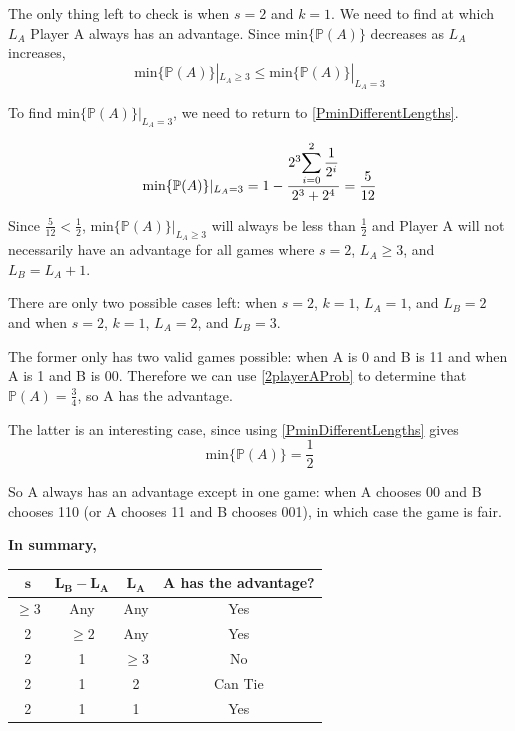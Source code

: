 \documentclass[english,12pt,a4paper,final]{article}
\begin{document}
The only thing left to check is when $s=2$ and $k=1$. We need to find at which $L_A$ Player A always has an advantage. Since $\text{min}\{\mathbb{P}(A)\}$ decreases as $L_A$ increases,
\begin{equation*}
	\text{min}\{\mathbb{P}(A)\}|_{L_A \ge 3} \le \text{min}\{\mathbb{P}(A)\}|_{L_A = 3}
\end{equation*}

To find $\text{min}\{\mathbb{P}(A)\}|_{L_A = 3}$, we need to return to \eqref{PminDifferentLengths}. 

\begin{equation*}
	\text{min}\{\mathbb{P}(A)\}|_{L_A = 3} = 1-\frac{2^3 \mathlarger{\sum_{i=0}^{2} \frac{1}{2^i}}}{2^3+2^4} = \frac{5}{12}
\end{equation*}

Since $\frac{5}{12} < \frac{1}{2}$, $\text{min}\{\mathbb{P}(A)\}|_{L_A \ge 3}$ will always be less than $\frac{1}{2}$ and Player A will not necessarily have an advantage for all games where $s=2$, $L_A \ge 3$, and $L_B = L_A + 1$.

There are only two possible cases left: when $s=2$, $k=1$, $L_A=1$, and $L_B=2$ and when $s=2$, $k=1$, $L_A=2$, and $L_B=3$. 

The former only has two valid games possible: when A is 0 and B is 11 and when A is 1 and B is 00. Therefore we can use \eqref{2playerAProb} to determine that $\mathbb{P}(A)=\frac{3}{4}$, so A has the advantage.

The latter is an interesting case, since using \eqref{PminDifferentLengths} gives
\begin{equation*}
	\text{min}\{\mathbb{P}(A)\} = \frac{1}{2}
\end{equation*}

So A always has an advantage except in one game: when A chooses 00 and B chooses 110 (or A chooses 11 and B chooses 001), in which case the game is fair.

\textbf{In summary,}

\begingroup
\setlength{\tabcolsep}{30pt} %
\renewcommand{\arraystretch}{1.5} %
\begin{tabular}{|c|c|c|c|}
	\hline
	$\mathbf{s}$ & $\mathbf{L_B-L_A}$ & $\mathbf{L_A}$ & \textbf{A has the advantage?} \\
	\hline
	$\ge 3$ & Any & Any & Yes \\
	\hline
	2 & $\ge 2$ & Any & Yes \\
	\hline
	2 & 1 & $\ge 3$ & No \\
	\hline
	2 & 1 & 2 & Can Tie \\
	\hline
	2 & 1 & 1 & Yes \\
	\hline
\end{tabular}
\endgroup
\end{document}
